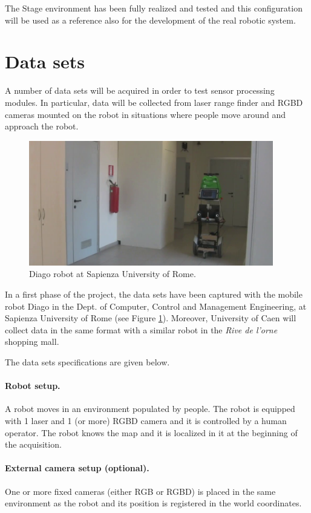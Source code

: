 \documentclass{article}
\begin{document}
The Stage environment has been fully realized and tested and this configuration will be used as a reference also for the development of the real robotic system.

\section{Data sets}

A number of data sets will be acquired in order to test sensor processing modules. In particular, data will be collected from laser range finder and RGBD cameras mounted on the robot in situations where people move around and approach the robot.

\begin{figure}
\includegraphics[width=0.95\textwidth]{diago.png}
\caption{Diago robot at Sapienza University of Rome.}
\label{fig:diago}
\end{figure}

In a first phase of the project,
the data sets have been captured with the mobile robot Diago in the Dept. of Computer, Control and Management Engineering, at Sapienza University of Rome (see Figure \ref{fig:diago}). Moreover, University of Caen will collect data in the same format with a similar robot in the \emph{Rive de l'orne} shopping mall.

The data sets specifications are given below.

\paragraph{Robot setup.} A robot moves in an environment populated by people. The robot is equipped with 1 laser and 1 (or more) RGBD camera and it is controlled by a human operator. The robot knows the map and it is localized in it at the beginning of the acquisition.

\paragraph{External camera setup (optional).}
One or more fixed cameras (either RGB or RGBD) is placed in the same environment as the robot and its position is registered in the world coordinates.
\end{document}
